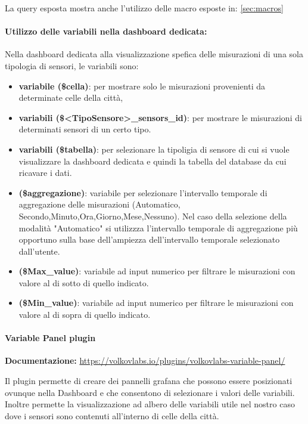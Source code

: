 La query esposta mostra anche l'utilizzo delle macro esposte in: \ref{sec:macros}
\paragraph*{Utilizzo delle variabili nella dashboard dedicata:}
Nella dashboard dedicata alla visualizzazione spefica delle misurazioni di una sola tipologia di sensori, le variabili sono:
\begin{itemize}
    \item \textbf{variabile (\$cella)}: per mostrare solo le misurazioni provenienti da determinate celle della città, 
    \item \textbf{variabili (\$<TipoSensore>\_sensors\_id)}: per mostrare le misurazioni di determinati sensori di un certo tipo.
    \item \textbf{variabili (\$tabella)}: per selezionare la tipoligia di sensore di cui si vuole visualizzare la dashboard dedicata e quindi la tabella del database da cui ricavare i dati.
    \item \textbf{(\$aggregazione)}: variabile per selezionare l'intervallo temporale di aggregazione delle misurazioni
    (Automatico, Secondo,Minuto,Ora,Giorno,Mese,Nessuno).
    Nel caso della selezione della modalità "Automatico" si utilizzza l'intervallo temporale di aggregazione più opportuno sulla base dell'ampiezza dell'intervallo temporale selezionato dall'utente.
    \item \textbf{(\$Max\_value)}: variabile ad input numerico per filtrare le misurazioni con valore al di sotto di quello indicato.
    \item \textbf{(\$Min\_value)}: variabile ad input numerico per filtrare le misurazioni con valore al di sopra di quello indicato.
\end{itemize}
\paragraph{Variable Panel plugin}
\textbf{Documentazione:}
\href{https://volkovlabs.io/plugins/volkovlabs-variable-panel/}{https://volkovlabs.io/plugins/volkovlabs-variable-panel/}


Il plugin permette di creare dei pannelli grafana che possono essere posizionati ovunque nella Dashboard e che consentono di selezionare i valori delle variabili.
Inoltre permette la visualizzazione ad albero delle variabili utile nel nostro caso dove i sensori sono contenuti all'interno di celle della città.

